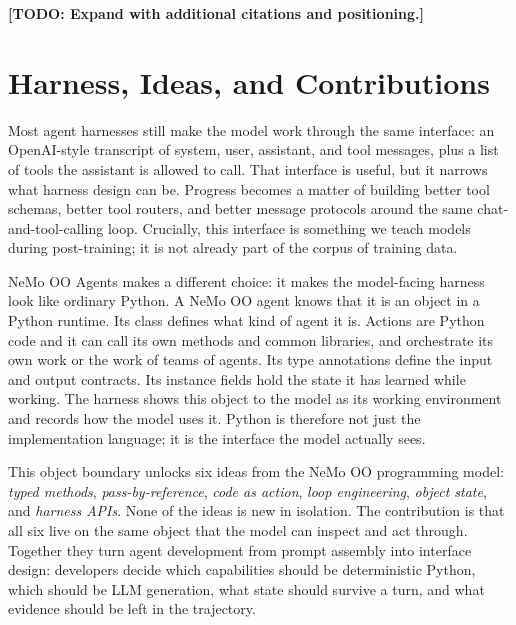 \documentclass[11pt, logo, onecolumn, copyright, colorlinks=true, allcolors=blue]{nvidiatechreport}
\newcommand{\placeholder}[1]{\textcolor{red!60!black}{\textbf{[TODO: #1]}}}
\begin{document}
\placeholder{Expand with additional citations and positioning.}




\section{Harness, Ideas, and Contributions}
\label{sec:harness-contributions}

Most agent harnesses still make the model work through the same interface:
an OpenAI-style transcript of system, user, assistant, and tool messages, plus
a list of tools the assistant is allowed to call.  That interface is useful,
but it narrows what harness design can be.  Progress becomes a matter of
building better tool schemas, better tool routers, and better message
protocols around the same chat-and-tool-calling loop.  Crucially, this interface
is something we teach models during post-training; it is not already part of the
corpus of training data.

NeMo OO Agents makes a different choice: it makes the model-facing harness look
like ordinary Python.  A NeMo OO agent knows that it is an object in a Python
runtime.  Its class defines what kind of agent it is.  Actions are Python code
and it can call its own methods and common libraries, and orchestrate its own
work or the work of teams of agents.  Its type annotations define the input and
output contracts.  Its instance fields hold the state it has learned while working.
The harness shows this object to the model as its working environment and
records how the model uses it.  Python is therefore not just the implementation
language; it is the interface the model actually sees.

This object boundary unlocks six ideas from the NeMo OO programming model:
\emph{typed methods}, \emph{pass-by-reference}, \emph{code as action},
\emph{loop engineering}, \emph{object state}, and \emph{harness APIs}. None of
the ideas is new in isolation. The contribution is that all six live on the
same object that the model can inspect and act through. Together they turn
agent development from prompt assembly into interface design: developers decide
which capabilities should be deterministic Python, which should be LLM
generation, what state should survive a turn, and what evidence should be left
in the trajectory.
\end{document}
